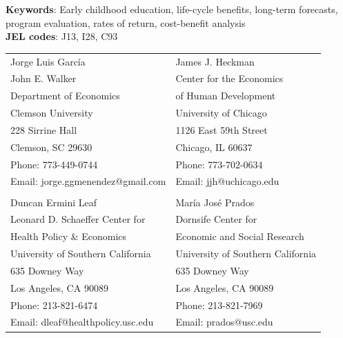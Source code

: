 \noindent \textbf{Keywords}: Early childhood education, life-cycle benefits, long-term forecasts, program evaluation, rates of return, cost-benefit analysis \\
\noindent \textbf{JEL codes}: J13, I28, C93\\


\bigskip
\begin{tabular}{ll}
Jorge Luis Garc\'{i}a                                          & James J. Heckman \\
John E. Walker                                     & Center for the Economics \\
 Department of Economics                   & of Human Development \\
Clemson University                                       & University of Chicago \\
228 Sirrine Hall                                       & 1126 East 59th Street \\
Clemson, SC 29630                                             & Chicago, IL 60637 \\
Phone: 773-449-0744                                       & Phone: 773-702-0634  \\
Email: jorge.ggmenendez@gmail.com                    & Email: jjh@uchicago.edu \\
                                                                          & \\
Duncan Ermini Leaf                                           & Mar\'{i}a Jos\'{e} Prados \\
Leonard D. Schaeffer Center for                       & Dornsife Center for  \\
Health Policy \& Economics                              & Economic and Social Research \\
University of Southern California                       & University of Southern California \\
635 Downey Way                                              & 635 Downey Way        \\
Los Angeles, CA 90089                                    & Los Angeles, CA 90089 \\
Phone: 213-821-6474                                       & Phone: 213-821-7969 \\
Email: dleaf@healthpolicy.usc.edu                     & Email: prados@usc.edu \\

\end{tabular}

